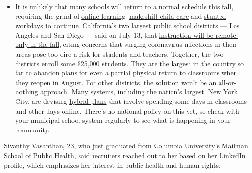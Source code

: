 \begin{itemize}
  \begin{itemize}
  \tightlist
  \item
    It is unlikely that many schools will return to a normal schedule
    this fall, requiring the grind of
    \href{https://www.nytimes.com/2020/06/05/us/coronavirus-education-lost-learning.html?action=click\&pgtype=Article\&state=default\&region=MAIN_CONTENT_3\&context=storylines_faq}{online
    learning},
    \href{https://www.nytimes.com/2020/05/29/us/coronavirus-child-care-centers.html?action=click\&pgtype=Article\&state=default\&region=MAIN_CONTENT_3\&context=storylines_faq}{makeshift
    child care} and
    \href{https://www.nytimes.com/2020/06/03/business/economy/coronavirus-working-women.html?action=click\&pgtype=Article\&state=default\&region=MAIN_CONTENT_3\&context=storylines_faq}{stunted
    workdays} to continue. California's two largest public school
    districts --- Los Angeles and San Diego --- said on July 13, that
    \href{https://www.nytimes.com/2020/07/13/us/lausd-san-diego-school-reopening.html?action=click\&pgtype=Article\&state=default\&region=MAIN_CONTENT_3\&context=storylines_faq}{instruction
    will be remote-only in the fall}, citing concerns that surging
    coronavirus infections in their areas pose too dire a risk for
    students and teachers. Together, the two districts enroll some
    825,000 students. They are the largest in the country so far to
    abandon plans for even a partial physical return to classrooms when
    they reopen in August. For other districts, the solution won't be an
    all-or-nothing approach.
    \href{https://bioethics.jhu.edu/research-and-outreach/projects/eschool-initiative/school-policy-tracker/}{Many
    systems}, including the nation's largest, New York City, are
    devising
    \href{https://www.nytimes.com/2020/06/26/us/coronavirus-schools-reopen-fall.html?action=click\&pgtype=Article\&state=default\&region=MAIN_CONTENT_3\&context=storylines_faq}{hybrid
    plans} that involve spending some days in classrooms and other days
    online. There's no national policy on this yet, so check with your
    municipal school system regularly to see what is happening in your
    community.
  \end{itemize}
\end{itemize}

Sivanthy Vasanthan, 23, who just graduated from Columbia University's
Mailman School of Public Health, said recruiters reached out to her
based on her
\href{https://www.linkedin.com/in/sivanthyvasanthan/}{LinkedIn} profile,
which emphasizes her interest in public health and human rights.

